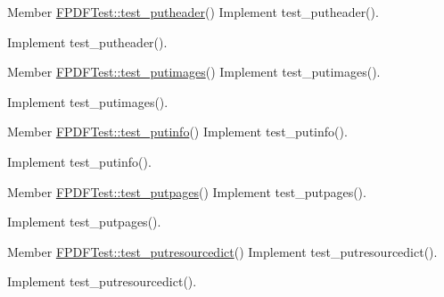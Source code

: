 \label{todo__todo000223}
\hypertarget{todo__todo000223}{}
 
\begin{DoxyDescription}
\item[Member \hyperlink{class_f_p_d_f_test_a251ce2920be57d475e757d53bb86e6da}{FPDFTest::test\_\-putheader}() ]Implement test\_\-putheader().

Implement test\_\-putheader().
\end{DoxyDescription}

\label{todo__todo000217}
\hypertarget{todo__todo000217}{}
 
\begin{DoxyDescription}
\item[Member \hyperlink{class_f_p_d_f_test_a6d869b2b1e1c07eb5069e970ec871deb}{FPDFTest::test\_\-putimages}() ]Implement test\_\-putimages().

Implement test\_\-putimages().
\end{DoxyDescription}

\label{todo__todo000221}
\hypertarget{todo__todo000221}{}
 
\begin{DoxyDescription}
\item[Member \hyperlink{class_f_p_d_f_test_a5a48e9f4563feee5eaf3a843f5307624}{FPDFTest::test\_\-putinfo}() ]Implement test\_\-putinfo().

Implement test\_\-putinfo().
\end{DoxyDescription}

\label{todo__todo000215}
\hypertarget{todo__todo000215}{}
 
\begin{DoxyDescription}
\item[Member \hyperlink{class_f_p_d_f_test_a5702b175b1a43336d0535951ac4a52c2}{FPDFTest::test\_\-putpages}() ]Implement test\_\-putpages().

Implement test\_\-putpages().
\end{DoxyDescription}

\label{todo__todo000219}
\hypertarget{todo__todo000219}{}
 
\begin{DoxyDescription}
\item[Member \hyperlink{class_f_p_d_f_test_aa986cecf3a66a65a53c428cd2aca622b}{FPDFTest::test\_\-putresourcedict}() ]Implement test\_\-putresourcedict().

Implement test\_\-putresourcedict().
\end{DoxyDescription}

